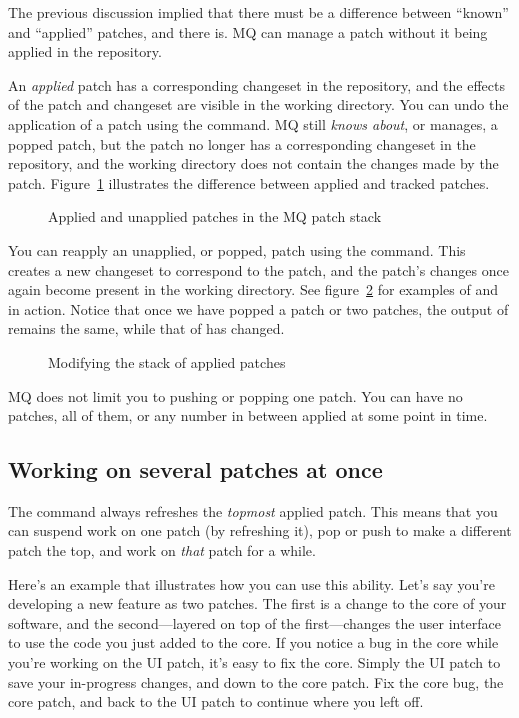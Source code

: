 The previous discussion implied that there must be a difference
between ``known'' and ``applied'' patches, and there is.  MQ can
manage a patch without it being applied in the repository.

An \emph{applied} patch has a corresponding changeset in the
repository, and the effects of the patch and changeset are visible in
the working directory.  You can undo the application of a patch using
the  command.  MQ still \emph{knows about}, or manages, a
popped patch, but the patch no longer has a corresponding changeset in
the repository, and the working directory does not contain the changes
made by the patch.  Figure~\ref{fig:mq:stack} illustrates the
difference between applied and tracked patches.

\begin{figure}[ht]
  \centering
  \caption{Applied and unapplied patches in the MQ patch stack}
  \label{fig:mq:stack}
\end{figure}

You can reapply an unapplied, or popped, patch using the 
command.  This creates a new changeset to correspond to the patch, and
the patch's changes once again become present in the working
directory.  See figure~\ref{ex:mq:qpop} for examples of 
and  in action.  Notice that once we have popped a patch
or two patches, the output of  remains the same, while
that of  has changed.

\begin{figure}[ht]
  \caption{Modifying the stack of applied patches}
  \label{ex:mq:qpop}
\end{figure}

MQ does not limit you to pushing or popping one patch.  You can have
no patches, all of them, or any number in between applied at some
point in time.

\subsection{Working on several patches at once}

The  command always refreshes the \emph{topmost}
applied patch.  This means that you can suspend work on one patch (by
refreshing it), pop or push to make a different patch the top, and
work on \emph{that} patch for a while.

Here's an example that illustrates how you can use this ability.
Let's say you're developing a new feature as two patches.  The first
is a change to the core of your software, and the second---layered on
top of the first---changes the user interface to use the code you just
added to the core.  If you notice a bug in the core while you're
working on the UI patch, it's easy to fix the core.  Simply
 the UI patch to save your in-progress changes, and
 down to the core patch.  Fix the core bug,
 the core patch, and  back to the UI
patch to continue where you left off.


